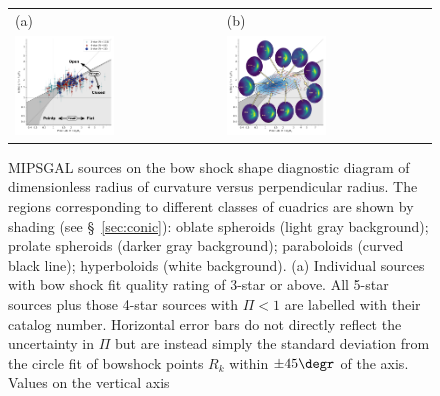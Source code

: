 \begin{figure}
  \centering
  \setlength\tabcolsep{0pt}
  \begin{tabular}{ll}
    (a) & (b) \\
    \includegraphics[width=0.5\textwidth]
    {figs/mipsgal-Rc-R90-zoom-annotated}
        & \includegraphics[width=0.5\textwidth]
          {figs/mipsgal-Rc-R90-thumbnails} 
  \end{tabular}
  \caption[]{MIPSGAL sources on the bow shock shape diagnostic diagram
    of dimensionless radius of curvature versus perpendicular radius.
    The regions corresponding to different classes of cuadrics are
    shown by shading (see \S~\ref{sec:conic}): oblate spheroids (light
    gray background); prolate spheroids (darker gray background);
    paraboloids (curved black line); hyperboloids (white background).
    (a) Individual sources with bow shock fit quality rating of 3-star
    or above.  All 5-star sources plus those 4-star sources with
    \(\Pi < 1\) are labelled with their \cite{Kobulnicky:2016a}
    catalog number.  Horizontal error bars do not directly reflect the
    uncertainty in \(\Pi\) but are instead simply the standard
    deviation from the circle fit of bowshock points \(R_k\) within
    \(\pm 45\degr\) of the axis.  Values on the vertical axis
}
\end{figure}

